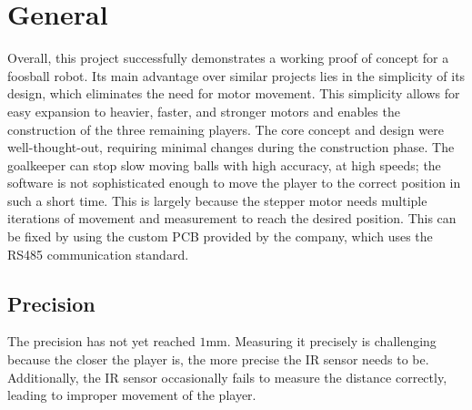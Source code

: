 \section{General}\label{sec:general4}
Overall, this project successfully demonstrates a working proof of concept for a foosball robot.
Its main advantage over similar projects lies in the simplicity of its design, which eliminates the need for motor movement.
This simplicity allows for easy expansion to heavier, faster, and stronger motors and enables the construction of the three remaining players.
The core concept and design were well-thought-out, requiring minimal changes during the construction phase.
The goalkeeper can stop slow moving balls with high accuracy, at high speeds; the software is not sophisticated enough to move the player to the correct position in such a short time.
This is largely because the stepper motor needs multiple iterations of movement and measurement to reach the desired position.
This can be fixed by using the custom PCB provided by the company, which uses the RS485 communication standard.


\subsection{Precision}\label{subsec:precision}
The precision has not yet reached $1\mathrm{mm}$.
Measuring it precisely is challenging because the closer the player is, the more precise the IR sensor needs to be.
Additionally, the IR sensor occasionally fails to measure the distance correctly, leading to improper movement of the player.
